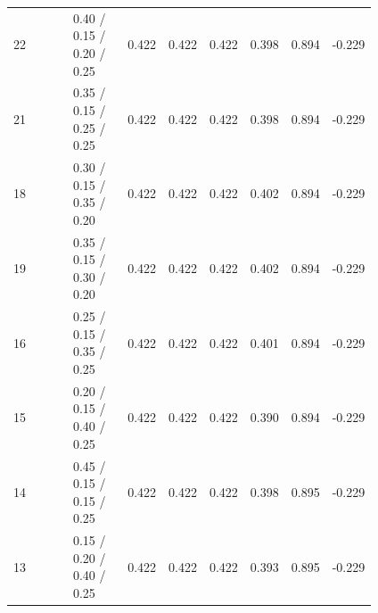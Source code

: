 \begin{table}[htbp]
\begin{tabular}{lp{0.151\linewidth}p{0.109\linewidth}p{0.109\linewidth}p{0.109\linewidth}p{0.109\linewidth}p{0.109\linewidth}p{0.115\linewidth}}
22 & 0.40 / 0.15 / 0.20 / 0.25 & 0.422 & 0.422 & 0.422 & 0.398 & 0.894 & -0.229 \\
21 & 0.35 / 0.15 / 0.25 / 0.25 & 0.422 & 0.422 & 0.422 & 0.398 & 0.894 & -0.229 \\
18 & 0.30 / 0.15 / 0.35 / 0.20 & 0.422 & 0.422 & 0.422 & 0.402 & 0.894 & -0.229 \\
19 & 0.35 / 0.15 / 0.30 / 0.20 & 0.422 & 0.422 & 0.422 & 0.402 & 0.894 & -0.229 \\
16 & 0.25 / 0.15 / 0.35 / 0.25 & 0.422 & 0.422 & 0.422 & 0.401 & 0.894 & -0.229 \\
15 & 0.20 / 0.15 / 0.40 / 0.25 & 0.422 & 0.422 & 0.422 & 0.390 & 0.894 & -0.229 \\
14 & 0.45 / 0.15 / 0.15 / 0.25 & 0.422 & 0.422 & 0.422 & 0.398 & 0.895 & -0.229 \\
13 & 0.15 / 0.20 / 0.40 / 0.25 & 0.422 & 0.422 & 0.422 & 0.393 & 0.895 & -0.229 \\
\bottomrule
\end{tabular}
\end{table}

